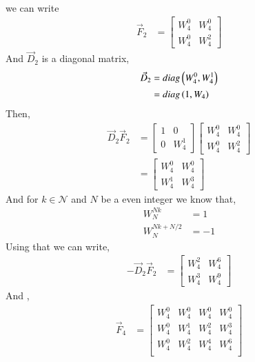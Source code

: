 \documentclass[journal,12pt,twocolumn]{IEEEtran}
\renewcommand\thesection{\arabic{section}}
\begin{document}
\begin{enumerate}[label=\thesection.\arabic*]
\begin{enumerate}[label=\arabic*.,ref=\thesection.\theenumi]
\begin{align}
     \end{align}
      we can write
     \begin{align}
       \vec{F}_{2} &= 
       \begin{bmatrix}
         W_4^{0} & W_4^{0} \\
         W_4^{0} & W_4^{2}
       \end{bmatrix} 
     \end{align}
     And $\vec{D}_{2}$ is a diagonal matrix,
     \begin{align}
       \vec{D}_{2} &= diag\left(W_4^0,W_4^1\right) \\
       &= diag\left(1,W_4\right)
     \end{align}
     Then,
     \begin{align}
       \vec{D}_2\vec{F}_2 &=\begin{bmatrix}
         1 & 0 \\
         0 & W_4^{1}
       \end{bmatrix}  
       \begin{bmatrix}
         W_4^{0} & W_4^{0} \\
         W_4^{0} & W_4^{2}
       \end{bmatrix} \\
       &= \begin{bmatrix}
         W_4^{0} & W_4^{0} \\
         W_4^{1} & W_4^{3}
       \end{bmatrix}
     \end{align}
     And for $k \in \mathcal{N}$ and $N$ be a even integer we know that,
     \begin{align}
       W_{N}^{Nk} &= 1 \label{fft-1}\\
       W_{N}^{Nk + N/2} &= -1 \label{fft-2}
     \end{align}
     Using that we can write,
     \begin{align}
       -\vec{D}_2\vec{F}_2 &= \begin{bmatrix}
         W_4^{2} & W_4^{6} \\
         W_4^{3} & W_4^{9}
       \end{bmatrix}
     \end{align}
     And ,
     \begin{align}
       \vec{F}_{4} &= \begin{bmatrix}
         W_4^0 &  W_4^0& W_4^0 & W_4^0  \\
         W_4^0 & W_4^1 & W_4^2 & W_4^3  \\
         W_4^0 & W_4^2 & W_4^4 &  W_4^6 \\

\end{bmatrix}
\end{align}
\end{enumerate}
\end{enumerate}
\end{document}
